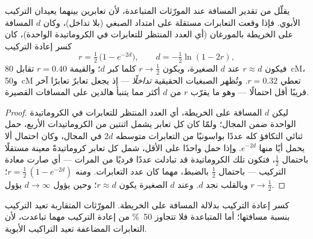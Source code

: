 \begin{theorem}\label{thm:b2:meiosis-heredity:haldane}
يقلّل  من تقدير المسافة عند المورّثات المتباعدة،
لأن تعابرين بينهما يعيدان التركيب الأبوي. فإذا وقعت التعابرات
مستقلة على امتداد الصبغي (بلا تداخل)، وكان $d$ المسافة على الخريطة
بالمورغان (أي العدد المنتظر للتعابرات في الكروماتيدة الواحدة)، كان
كسر إعادة التركيب
\[
r = \tfrac12\,\bigl(1 - e^{-2d}\bigr), \qquad d = -\tfrac12\ln(1 - 2r),
\]
فيكون $r \approx d$ عند $d$ الصغيرة، ويكون $r \to \tfrac12$ كلما
كبر $d$؛ والقيمة $r = 0.40$ تقابل \qty{80}{cM}، و\qty{50}{cM}
تعطي $r = 0.32$. وتُظهر الصبغيات الحقيقية \emph{تداخلًا} --- إذ
يجعل تعابرٌ تعابرًا آخر قريبًا أقل احتمالًا --- وهو ما يقرّب $r$ من
$d$ أكثر مما يتنبأ هالدين على المسافات القصيرة.
\end{theorem}
\begin{proof}
ليكن $d$ المسافة على الخريطة، أي العدد المنتظر للتعابرات في
الكروماتيدة الواحدة ضمن المجال؛ ولمّا كان كل تعابر يشمل اثنتين من
الكروماتيدات الأربع، حمل ثنائي التكافؤ كله عددًا بواسونيًا من
التعابرات متوسطه $2d$ في المجال، وكان احتمال ألا يحمل أيًا منها
$e^{-2d}$. وإذا حمل واحدًا على الأقل، شمل كل تعابر كروماتيدةً معينة
مستقلًا باحتمال
$\tfrac12$، فتكون تلك الكروماتيدة قد تبادلت عددًا فرديًا من
المرات --- أي صارت معادة التركيب --- باحتمال $\tfrac12$ بالضبط،
مهما كان عدد التعابرات. ومنه $r = \tfrac12\,(1 -
e^{-2d})$؛ وبالقلب نجد $d$. وعند $d$ الصغيرة يكون $r \approx d$؛ وحين
يؤول $d \to \infty$ يؤول $r \to \tfrac12$.
\end{proof}

\begin{omfigure}

{\small كسر إعادة التركيب بدلالة المسافة على الخريطة. المورّثات
المتقاربة تعيد التركيب بنسبة مسافتها؛ أما المتباعدة فلا تتجاوز
\qty{50}{\%} من إعادة التركيب مهما تباعدت، لأن التعابرات المضاعفة
تعيد التراكيب الأبوية.}
\end{omfigure}

